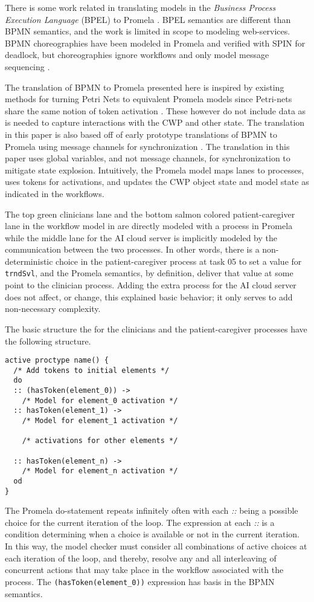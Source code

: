 There is some work related in translating models in the \emph{Business Process Execution Language} (BPEL) to Promela \cite{bpelToPromela}. BPEL semantics are different than BPMN semantics, and the work is limited in scope to modeling web-services. BPMN choreographies have been modeled in Promela and verified with SPIN for deadlock, but choreographies ignore workflows and only model message sequencing \cite{choreography}.

The translation of BPMN to Promela presented here is inspired by existing methods for turning Petri Nets to equivalent Promela models since Petri-nets share the same notion of token activation \cite{petrinetToPromela, petrinetInspiration}. These however do not include data as is needed to capture interactions with the CWP and other state. The translation in this paper is also based off of early prototype translations of BPMN to Promela using message channels for synchronization \cite{bpmn2promela}. The translation in this paper uses global variables, and not message channels, for synchronization to mitigate state explosion.   Intuitively, the Promela model maps lanes to processes, uses tokens for activations, and updates the CWP object state and model state as indicated in the workflows.

The top green clinicians lane and the bottom salmon colored patient-caregiver lane in the workflow model in  are directly modeled with a process in Promela while the middle lane for the AI cloud server is implicitly modeled by the communication between the two processes. In other words, there is a non-deterministic choice in the patient-caregiver process at task 05 to set a value for \texttt{trndSvl}, and the Promela semantics, by definition, deliver that value at some point to the clinician process. Adding the extra process for the AI cloud server does not affect, or change, this explained basic behavior; it only serves to add non-necessary complexity.

The basic structure the for the clinicians and the patient-caregiver processes have the following structure.
%
{\small
\begin{lstlisting}[style=myPromela]
active proctype name() {
  /* Add tokens to initial elements */
  do
  :: (hasToken(element_0)) ->
    /* Model for element_0 activation */
  :: hasToken(element_1) ->
    /* Model for element_1 activation */
 
    /* activations for other elements */
    
  :: hasToken(element_n) ->
    /* Model for element_n activation */
  od
}
\end{lstlisting}
}
%
\noindent The Promela do-statement repeats infinitely often with each \emph{::} being a possible choice for the current iteration of the loop. The expression at each \emph{::} is a condition determining when a choice is available or not in the current iteration. In this way, the model checker must consider all combinations of active choices at each iteration of the loop, and thereby, resolve any and all interleaving of concurrent actions that may take place in the workflow associated with the process. The \texttt{(hasToken(element\_0))} expression has basis in the BPMN semantics.

